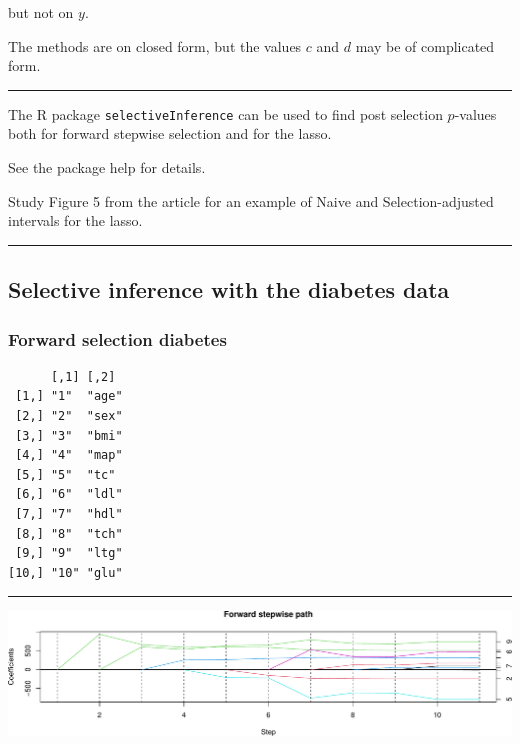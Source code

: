\documentclass[
  letterpaper,
  DIV=11,
  numbers=noendperiod]{scrartcl}
\begin{document}
but not on \(y\).

The methods are on closed form, but the values \(c\) and \(d\) may be of
complicated form.

\begin{center}\rule{0.5\linewidth}{0.5pt}\end{center}

The R package \texttt{selectiveInference} can be used to find post
selection \(p\)-values both for forward stepwise selection and for the
lasso.

See the package help for details.

Study Figure 5 from the article for an example of Naive and
Selection-adjusted intervals for the lasso.

\begin{center}\rule{0.5\linewidth}{0.5pt}\end{center}

\hypertarget{selective-inference-with-the-diabetes-data}{%
\subsection{Selective inference with the diabetes
data}\label{selective-inference-with-the-diabetes-data}}

\hypertarget{forward-selection-diabetes}{%
\subsubsection{Forward selection
diabetes}\label{forward-selection-diabetes}}

\begin{verbatim}
      [,1] [,2] 
 [1,] "1"  "age"
 [2,] "2"  "sex"
 [3,] "3"  "bmi"
 [4,] "4"  "map"
 [5,] "5"  "tc" 
 [6,] "6"  "ldl"
 [7,] "7"  "hdl"
 [8,] "8"  "tch"
 [9,] "9"  "ltg"
[10,] "10" "glu"
\end{verbatim}

\begin{center}\rule{0.5\linewidth}{0.5pt}\end{center}

\includegraphics{W6_files/figure-pdf/unnamed-chunk-46-1.pdf}
\end{document}
